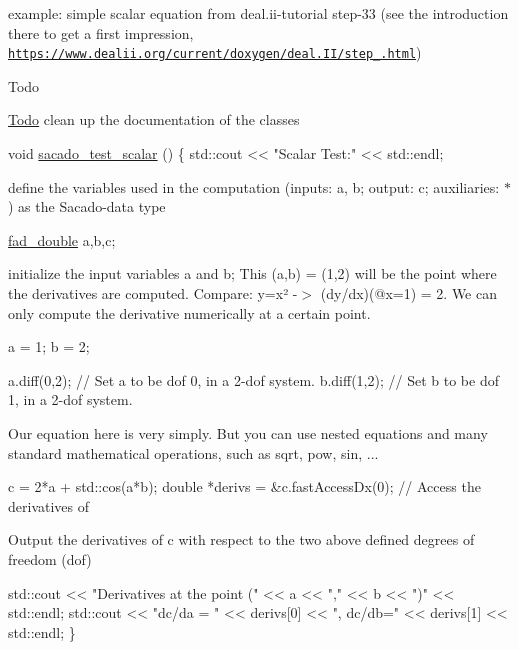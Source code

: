 \begin{DoxyEnumerate}
\item example\+: simple scalar equation from deal.\+ii-\/tutorial step-\/33 (see the introduction there to get a first impression, \href{https://www.dealii.org/current/doxygen/deal.II/step_33.html}{\tt https\+://www.\+dealii.\+org/current/doxygen/deal.\+I\+I/step\+\_.\+html}) \begin{DoxyRefDesc}{Todo}
\item[\hyperlink{todo__todo000004}{Todo}]clean up the documentation of the classes\end{DoxyRefDesc}

\end{DoxyEnumerate}


\begin{DoxyCode}
\textcolor{keywordtype}{void} \hyperlink{Sacado__example_8cc_a71b2675e62203edc430e7ffc8a365193}{sacado\_test\_scalar} ()
\{
    std::cout << \textcolor{stringliteral}{"Scalar Test:"} << std::endl;
\end{DoxyCode}
 define the variables used in the computation (inputs\+: a, b; output\+: c; auxiliaries\+: $\ast$) as the Sacado-\/data type 
\begin{DoxyCode}
\hyperlink{Sacado__example_8cc_a868b94676739e612d9c95940e70892a9}{fad\_double} a,b,c;
\end{DoxyCode}
 initialize the input variables a and b; This (a,b) = (1,2) will be the point where the derivatives are computed. Compare\+: y=x² -\/$>$ (dy/dx)(@x=1) = 2. We can only compute the derivative numerically at a certain point. 
\begin{DoxyCode}
 a = 1;
 b = 2;

a.diff(0,2);  \textcolor{comment}{// Set a to be dof 0, in a 2-dof system.}
b.diff(1,2);  \textcolor{comment}{// Set b to be dof 1, in a 2-dof system.}
\end{DoxyCode}
 Our equation here is very simply. But you can use nested equations and many standard mathematical operations, such as sqrt, pow, sin, ... 
\begin{DoxyCode}
c = 2*a + std::cos(a*b);
\textcolor{keywordtype}{double} *derivs = &c.fastAccessDx(0); \textcolor{comment}{// Access the derivatives of}
\end{DoxyCode}
 Output the derivatives of c with respect to the two above defined degrees of freedom (dof) 
\begin{DoxyCode}
    std::cout << \textcolor{stringliteral}{"Derivatives at the point ("} << a << \textcolor{stringliteral}{","} << b << \textcolor{stringliteral}{")"} << std::endl;
    std::cout << \textcolor{stringliteral}{"dc/da = "} << derivs[0] << \textcolor{stringliteral}{", dc/db="} << derivs[1] << std::endl;
\}
\end{DoxyCode}
